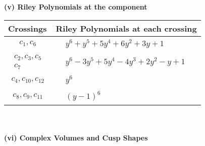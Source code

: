 \documentclass[1p]{elsarticle_modified}
\theoremstyle{definition}
\begin{document}
\newpage\renewcommand{\arraystretch}{1}
\flushleft \textbf{(v) Riley Polynomials at the component}\newline \\
\begin{tabular}{m{50pt}|m{274pt}}
Crossings & \hspace{64pt}Riley Polynomials at each crossing \\
\hline $$\begin{aligned}c_{1},c_{6}\end{aligned}$$&$\begin{aligned}
&y^6+y^5+5 y^4+6 y^2+3 y+1
\end{aligned}$\\
\hline $$\begin{aligned}c_{2},c_{3},c_{5}\\c_{7}\end{aligned}$$&$\begin{aligned}
&y^6-3 y^5+5 y^4-4 y^3+2 y^2- y+1
\end{aligned}$\\
\hline $$\begin{aligned}c_{4},c_{10},c_{12}\end{aligned}$$&$\begin{aligned}
&y^6
\end{aligned}$\\
\hline $$\begin{aligned}c_{8},c_{9},c_{11}\end{aligned}$$&$\begin{aligned}
&(y-1)^6
\end{aligned}$\\
\hline
\end{tabular}\\~\\
\newpage\flushleft \textbf{(vi) Complex Volumes and Cusp Shapes}
\end{document}
